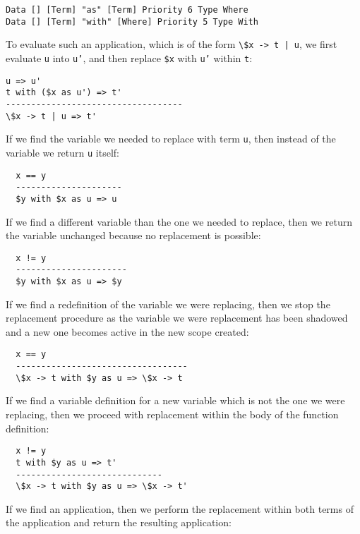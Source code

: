 \begin{lstlisting}
Data [] [Term] "as" [Term] Priority 6 Type Where
Data [] [Term] "with" [Where] Priority 5 Type With
\end{lstlisting}

To evaluate such an application, which is of the form \texttt{\textbackslash\$x -> t | u}, we first evaluate \texttt{u} into \texttt{u'}, and then replace \texttt{\$x} with \texttt{u'} within \texttt{t}:

\begin{lstlisting}
u => u'
t with ($x as u') => t'
-----------------------------------
\$x -> t | u => t'
\end{lstlisting}

If we find the variable we needed to replace with term \texttt{u}, then instead of the variable we return \texttt{u} itself:

\begin{lstlisting}
  x == y
  ---------------------
  $y with $x as u => u
\end{lstlisting}

If we find a different variable than the one we needed to replace, then we return the variable unchanged because no replacement is possible:

\begin{lstlisting}
  x != y
  ----------------------
  $y with $x as u => $y
\end{lstlisting}

If we find a redefinition of the variable we were replacing, then we stop the replacement procedure as the variable we were replacement has been shadowed and a new one becomes active in the new scope created:

\begin{lstlisting}
  x == y
  ----------------------------------
  \$x -> t with $y as u => \$x -> t
\end{lstlisting}

If we find a variable definition for a new variable which is not the one we were replacing, then we proceed with replacement within the body of the function definition:

\begin{lstlisting}
  x != y
  t with $y as u => t'
  -----------------------------
  \$x -> t with $y as u => \$x -> t'
\end{lstlisting}

If we find an application, then we perform the replacement within both terms of the application and return the resulting application:

